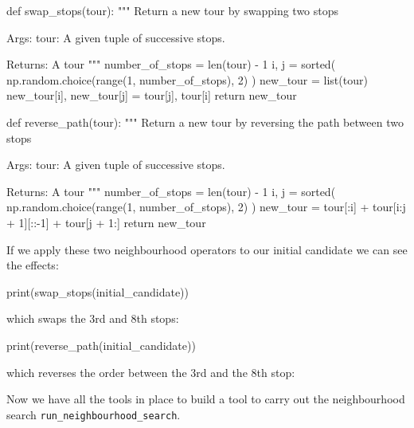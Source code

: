 \begin{pyin}
def swap_stops(tour):
    """
    Return a new tour by swapping two stops

    Args:
        tour: A given tuple of successive stops.

    Returns:
        A tour
    """
    number_of_stops = len(tour) - 1
    i, j = sorted(
        np.random.choice(range(1, number_of_stops), 2)
    )
    new_tour = list(tour)
    new_tour[i], new_tour[j] = tour[j], tour[i]
    return new_tour

def reverse_path(tour):
    """
    Return a new tour by reversing the path between two stops

    Args:
        tour: A given tuple of successive stops.

    Returns:
        A tour
    """
    number_of_stops = len(tour) - 1
    i, j = sorted(
        np.random.choice(range(1, number_of_stops), 2)
    )
    new_tour = tour[:i] + tour[i:j + 1][::-1] + tour[j + 1:]
    return new_tour
\end{pyin}

If we apply these two neighbourhood operators to our initial candidate we can
see the effects:

\begin{pyin}
print(swap_stops(initial_candidate))
\end{pyin}

which swaps the 3rd and 8th stops:

\begin{pyout}
[0, 7, 12, 5, 11, 3, 9, 2, 8, 1, 4, 10, 6, 0]
\end{pyout}

\begin{pyin}
print(reverse_path(initial_candidate))
\end{pyin}

which reverses the order between the 3rd and the 8th stop:

\begin{pyout}
[0, 7, 2, 9, 3, 11, 5, 12, 8, 10, 4, 1, 6, 0]
\end{pyout}

Now we have all the tools in place to build a tool to carry out the
neighbourhood search \texttt{run_neighbourhood_search}.

